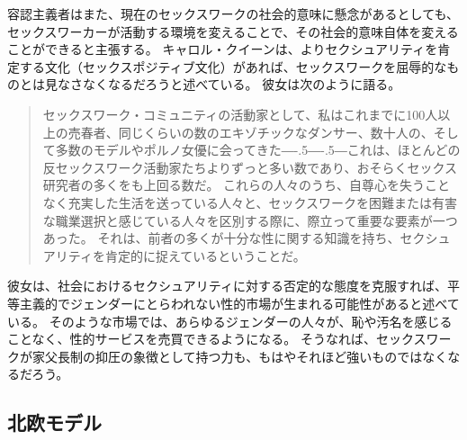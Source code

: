 \documentclass[paper=a4,book,openany]{jlreq}
\def\DDASH{―\kern-.5\zw―\kern-.5\zw―} %
\begin{document}
容認主義者はまた、現在のセックスワークの社会的意味に懸念があるとしても、セックスワーカーが活動する環境を変えることで、その社会的意味自体を変えることができると主張する。
キャロル・クイーンは、よりセクシュアリティを肯定する文化（セックスポジティブ文化）があれば、セックスワークを屈辱的なものとは見なさなくなるだろうと述べている。
彼女は次のように語る。

\begin{quote}
セックスワーク・コミュニティの活動家として、私はこれまでに100人以上の売春者、同じくらいの数のエキゾチックなダンサー、数十人の、そして多数のモデルやポルノ女優に会ってきた{\DDASH}これは、ほとんどの反セックスワーク活動家たちよりずっと多い数であり、おそらくセックス研究者の多くをも上回る数だ。
これらの人々のうち、自尊心を失うことなく充実した生活を送っている人々と、セックスワークを困難または有害な職業選択と感じている人々を区別する際に、際立って重要な要素が一つあった。
それは、前者の多くが十分な性に関する知識を持ち、セクシュアリティを肯定的に捉えているということだ。
\citep[pp.128--129]{queen97:_sex_radic_polit_sex_posit}
\end{quote}

彼女は、社会におけるセクシュアリティに対する否定的な態度を克服すれば、平等主義的でジェンダーにとらわれない性的市場が生まれる可能性があると述べている。
そのような市場では、あらゆるジェンダーの人々が、恥や汚名を感じることなく、性的サービスを売買できるようになる。
そうなれば、セックスワークが家父長制の抑圧の象徴として持つ力も、もはやそれほど強いものではなくなるだろう。

\subsection{北欧モデル}
\end{document}
